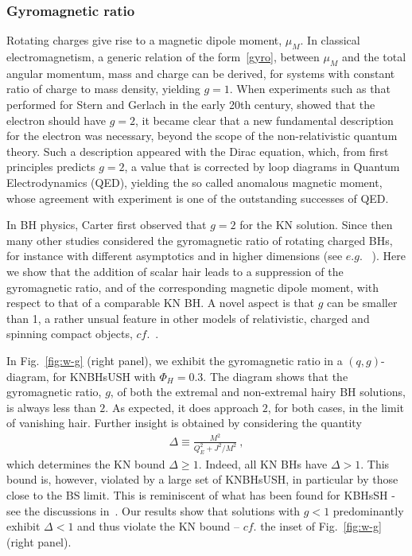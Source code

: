\subsubsection{Gyromagnetic ratio}
Rotating charges give rise to a magnetic dipole moment, $\mu_M$. 
In classical electromagnetism, a generic relation of the form~\eqref{gyro}, 
between $\mu_M$ and the total angular momentum, mass and charge can be derived, 
for systems with constant ratio of charge to mass density, yielding $g=1$. 
When experiments such as that performed for Stern and Gerlach in the early 20th century, 
showed that the electron should have $g=2$, it became clear that a new fundamental description 
for the electron was necessary, beyond the scope of the non-relativistic quantum theory. 
Such a description appeared with the Dirac equation, which, from first principles predicts $g=2$, 
a value that is corrected by loop diagrams in Quantum Electrodynamics (QED), 
yielding the so called anomalous magnetic moment, whose agreement 
with experiment is one of the outstanding successes of QED.

In BH physics, Carter first observed that $g=2$ for the KN solution. 
Since then many other studies considered the gyromagnetic ratio of rotating charged BHs, 
for instance with different asymptotics and in higher dimensions (see $e.g.$~
\cite{Garfinkle:1990ib,Herdeiro:2000ap,Aliev:2004ec,Ortaggio:2006ng,Aliev:2006tt}). 
Here we show that the addition of scalar hair leads to a suppression of the gyromagnetic ratio, 
and of the corresponding magnetic dipole moment, 
with respect to that of a comparable KN BH.  
 A novel aspect is that $g$ 
can be smaller than 1, a rather unsual feature in other models of relativistic, 
charged and spinning compact objects, 
$cf.$~\cite{Novak:2003uj}. 


In Fig.~\ref{fig:w-g} (right panel), we exhibit the gyromagnetic ratio in a $(q,g)$-diagram, for KNBHsUSH with $\Phi_H=0.3$.
The diagram shows that the gyromagnetic ratio, $g$, of both the extremal and non-extremal hairy BH solutions, is always less than $2$.
As expected, it does approach $2$, for both cases, in the limit of vanishing hair.
Further insight is obtained by considering the quantity
\begin{align}
\Delta\equiv \frac{M^2}{Q_E^2+J^2/M^2} \ ,
\end{align}
which determines the KN bound $\Delta\geqslant 1$. Indeed, all KN BHs have $\Delta>1$. This bound is, however, violated by a large set of KNBHsUSH, in particular by those close to the BS limit. This is reminiscent of what has been found for KBHsSH - see the discussions in~\cite{Herdeiro:2014goa,Herdeiro:2015gia,Herdeiro:2015tia,Delgado:2016zxv}.  Our results show that
solutions with $g<1$ predominantly exhibit $\Delta<1$ and thus violate the KN bound -- $cf.$ the inset of Fig.~\ref{fig:w-g} (right panel).



